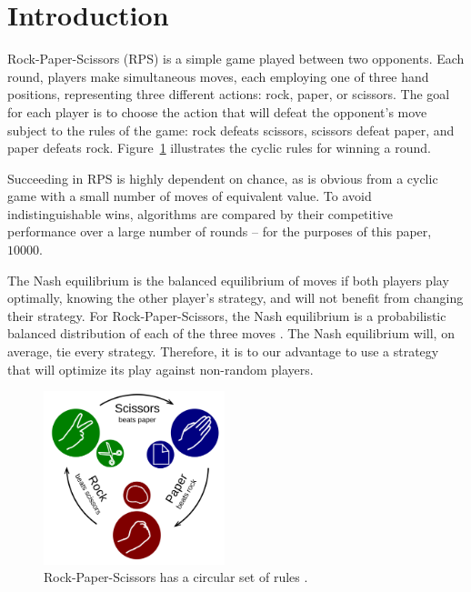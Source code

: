 
\section{Introduction}
\label{sec:intro}

Rock-Paper-Scissors (RPS) is a simple game played between two opponents.  Each round, players make simultaneous moves, each employing one of three hand positions, representing three different actions: rock, paper, or scissors.  The goal for each player is to choose the action that will defeat the opponent's move subject to the rules of the game: rock defeats scissors, scissors defeat paper, and paper defeats rock.  Figure~\ref{fig:rps} illustrates the cyclic rules for winning a round.

Succeeding in RPS is highly dependent on chance, as is obvious from a cyclic game with a small number of moves of equivalent value.  To avoid indistinguishable wins, algorithms are compared by their competitive performance over a large number of rounds -- for the purposes of this paper, $10000$.

The Nash equilibrium is the balanced equilibrium of moves if both players play optimally, knowing the other player's strategy, and will not benefit from changing their strategy. For Rock-Paper-Scissors, the Nash equilibrium is a probabilistic balanced distribution of each of the three moves \cite{noregrets}.  The Nash equilibrium will, on average, tie every strategy.  Therefore, it is to our advantage to use a strategy that will optimize its play against non-random players.  

\begin{figure}[ht]
	\centering
	\includegraphics[width=0.47\textwidth]{figs/rps.png}
	\caption{Rock-Paper-Scissors has a circular set of rules \cite{fig:rps}.}
	\label{fig:rps}
\end{figure}


